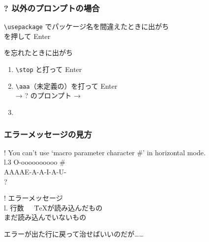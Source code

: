 \begin{frame}[fragile]
	\frametitle{{\errorfont ?} 以外のプロンプトの場合}
	\begin{block}{\errorfont{}}
		{\footnotesize \verb+\usepackage+ でパッケージ名を間違えたときに出がち}\\
		を押して Enter
	\end{block}
	
	\hspace*{5em}\hrulefill\hspace*{5em}
	
	\begin{block}{\errorfont\fbox{*}}
		{\footnotesize \verb++ を忘れたときに出がち}
		\begin{enumerate}
			\item \verb+\stop+ と打って Enter
			\item \verb+\aaa+（未定義の）を打って Enter\\
				→ {\errorfont ?} のプロンプト → 
			\item {}
		\end{enumerate}
	\end{block}
\end{frame}

\begin{frame}
	\frametitle{エラーメッセージの見方}
	
	\bgroup\errorfont
	\begin{tabbing}
		! You can't use `macro parameter character \#' in horizontal mode.\\
		l.3 O-oooooooooo \#\=\\
		                  \>AAAAE-A-A-I-A-U- \\
		?
	\end{tabbing}
	\egroup
	\pause
	
	\begin{tabbing}
	! エラーメッセージ\\
	l. 行数~~~\= \TeX が読み込んだもの\=\\
		\>\>まだ読み込んでいないもの
	\end{tabbing}
	
	エラーが出た行に戻って治せばいいのだが……
\end{frame}

